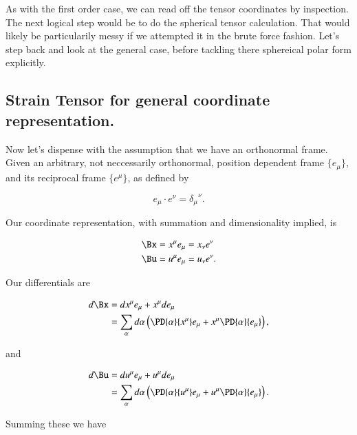As with the first order case, we can read off the tensor coordinates by inspection.  The next logical step would be to do the spherical tensor calculation.  That would likely be particularily messy if we attempted it in the brute force fashion.  Let's step back and look at the general case, before tackling there sphereical polar form explicitly.

\subsection{Strain Tensor for general coordinate representation.}

Now let's dispense with the assumption that we have an orthonormal frame.  Given an arbitrary, not neccessarily orthonormal, position dependent frame $\{e_\mu\}$, and its reciprocal frame $\{e^\mu\}$, as defined by

\begin{equation}\label{eqn:continuumL2:510}
e_\mu \cdot e^\nu = {\delta_\mu}^\nu.
\end{equation}

Our coordinate representation, with summation and dimensionality implied, is

\begin{align}\label{eqn:continuumL2:530}
\Bx &= x^\mu e_\mu = x_\nu e^\nu \\
\Bu &= u^\mu e_\mu = u_\nu e^\nu.
\end{align}

Our differentials are

\begin{equation}\label{eqn:continuumL2:550}
\begin{aligned}
d\Bx 
&= dx^\mu e_\mu + x^\mu d e_\mu \\
&= \sum_\alpha d\alpha \left( 
\PD{\alpha}{x^\mu} e_\mu
+
x^\mu
\PD{\alpha}{e_\mu} 
\right),
\end{aligned}
\end{equation}

and

\begin{equation}\label{eqn:continuumL2:570}
\begin{aligned}
d\Bu 
&= du^\mu e_\mu + u^\mu d e_\mu \\
&= 
\sum_\alpha
d\alpha \left( 
\PD{\alpha}{u^\mu} e_\mu
+
u^\mu
\PD{\alpha}{e_\mu} 
\right).
\end{aligned}
\end{equation}

Summing these we have

